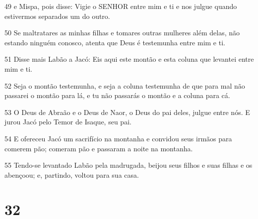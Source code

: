\par 49 e Mispa, pois disse: Vigie o SENHOR entre mim e ti e nos julgue quando estivermos separados um do outro.
\par 50 Se maltratares as minhas filhas e tomares outras mulheres além delas, não estando ninguém conosco, atenta que Deus é testemunha entre mim e ti.
\par 51 Disse mais Labão a Jacó: Eis aqui este montão e esta coluna que levantei entre mim e ti.
\par 52 Seja o montão testemunha, e seja a coluna testemunha de que para mal não passarei o montão para lá, e tu não passarás o montão e a coluna para cá.
\par 53 O Deus de Abraão e o Deus de Naor, o Deus do pai deles, julgue entre nós. E jurou Jacó pelo Temor de Isaque, seu pai.
\par 54 E ofereceu Jacó um sacrifício na montanha e convidou seus irmãos para comerem pão; comeram pão e passaram a noite na montanha.
\par 55 Tendo-se levantado Labão pela madrugada, beijou seus filhos e suas filhas e os abençoou; e, partindo, voltou para sua casa.

\chapter{32}

